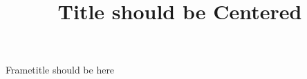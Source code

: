 \documentclass{beamer}
\title{Title should be Centered}
\begin{document}
{
    \hoffset=-2cm
    \begin{frame}
    \titlepage
    \end{frame}
}

\begin{frame}{Frametitle should be here}
\lipsum
\end{frame}
\end{document}
